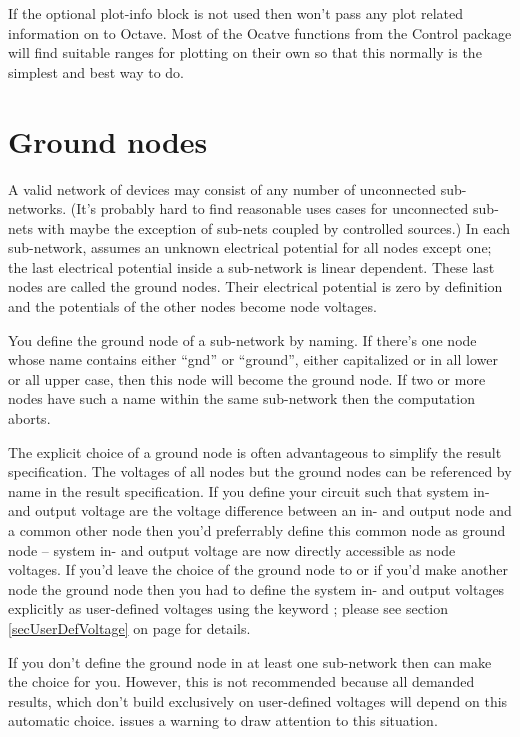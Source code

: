If the optional plot-info block is not used then \linnet{} won't pass any
plot related information on to Octave. Most of the Ocatve functions from
the Control package will find suitable ranges for plotting on their own so
that this normally is the simplest and best way to do.


\section{Ground nodes}
\label{secGndNode}

A valid network of devices may consist of any number of unconnected
sub-networks. (It's probably hard to find reasonable uses cases for
unconnected sub-nets with maybe the exception of sub-nets coupled by
controlled sources.) In each sub-network, \linnet{} assumes an unknown
electrical potential for all nodes except one; the last electrical
potential inside a sub-network is linear dependent. These last nodes are
called the ground nodes. Their electrical potential is zero by definition
and the potentials of the other nodes become node voltages.

You define the ground node of a sub-network by naming. If there's one node
whose name contains either ``gnd'' or ``ground'', either capitalized or in
all lower or all upper case, then this node will become the ground node.
If two or more nodes have such a name within the same sub-network then the
computation aborts.

The explicit choice of a ground node is often advantageous to simplify the
result specification. The voltages of all nodes but the ground nodes can
be referenced by name in the result specification. If you define your
circuit such that system in- and output voltage are the voltage difference
between an in- and output node and a common other node then you'd
preferrably define this common node as ground node -- system in- and
output voltage are now directly accessible as node voltages. If you'd
leave the choice of the ground node to \linnet{} or if you'd make another
node the ground node then you had to define the system in- and output
voltages explicitly as user-defined voltages using the keyword ;
please see section \ref{secUserDefVoltage} on page
\pageref{secUserDefVoltage} for details.

If you don't define the ground node in at least one sub-network then
\linnet{} can make the choice for you. However, this is not recommended
because all demanded results, which don't build exclusively on
user-defined voltages will depend on this automatic choice. \linnet{}
issues a warning to draw attention to this situation.

